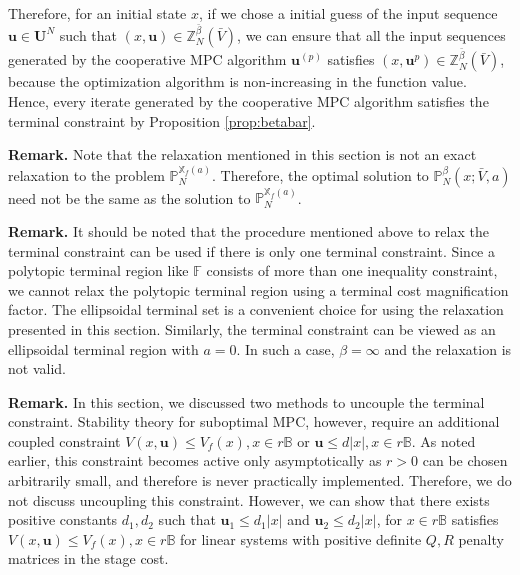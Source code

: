 \documentclass[10pt, twocolumn]{article}
\newcommand{\bu}{\mathbf{u}}
\newcommand{\norm}[1]{\vert #1 \vert}
\theoremstyle{definition}
\begin{document}
Therefore, for an initial state $x$, if we chose a initial guess of the
input sequence $\bu \in \mathbf{U}^N$ such that $(x,\bu) \in
\mathbb{Z}_N^{\bar{\beta}}(\bar{V})$, we can ensure that all the input
sequences generated by the cooperative MPC algorithm $\bu^{(p)}$
satisfies  $(x,\bu^{p}) \in \mathbb{Z}_N^{\bar{\beta}}(\bar{V})$,
because the optimization algorithm is non-increasing in the function
value. Hence, every iterate generated by the cooperative MPC algorithm
satisfies the terminal constraint by Proposition \ref{prop:betabar}. 

\textbf{Remark.} Note that the relaxation mentioned in this section is
not an exact relaxation to the problem
$\mathbb{P}_N^{\mathbb{X}_f(a)}$. Therefore, the optimal solution to
$\mathbb{P}^\beta_N(x;\bar{V},a)$ need not be the same as the solution
to $\mathbb{P}_N^{\mathbb{X}_f(a)}$.
 
\textbf{Remark.} It should be noted that the procedure mentioned above to relax the terminal constraint can be used if there is only one terminal constraint. Since a polytopic terminal region like $\mathbb{F}$ consists of more than one inequality constraint, we cannot relax the polytopic terminal region using a terminal cost magnification factor. The ellipsoidal terminal set is a convenient choice for using the relaxation presented in this section. Similarly, the terminal constraint can be viewed as an ellipsoidal terminal region with $a=0$. In such a case, $\beta = \infty$ and the relaxation is not valid. 

\textbf{Remark.} In this section, we discussed two methods to uncouple the terminal constraint. Stability theory for suboptimal MPC, however, require an additional coupled constraint $V(x,\bu) \leq V_f(x), x \in r\mathbb{B}$ or $\bu \leq d\norm{x}, x\in r\mathbb{B}$. As noted earlier, this constraint becomes active only asymptotically as $r>0$ can be chosen arbitrarily small, and therefore is never practically implemented. Therefore, we do not discuss uncoupling this constraint. However, we can show that there exists positive constants $d_1,d_2$ such that $\bu_1 \leq d_1\norm{x}$ and $\bu_2 \leq d_2\norm{x}$, for $x \in r \mathbb{B}$ satisfies $V(x,\bu) \leq V_f(x), x \in r\mathbb{B}$ for linear systems with positive definite $Q,R$ penalty matrices in the stage cost. 
\end{document}
